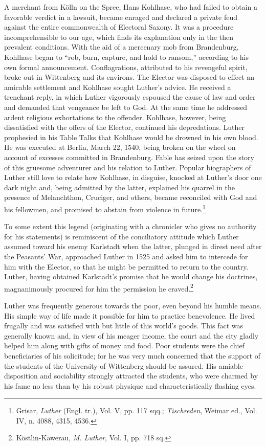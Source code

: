 A merchant from Kölln on the Spree, Hans Kohlhase, who had
failed to obtain a favorable verdict in a lawsuit, became enraged and
declared a private feud against the entire commonwealth of Electoral
Saxony. It was a procedure incomprehensible to our age, which finds
its explanation only in the then prevalent conditions. With the aid
of a mercenary mob from Brandenburg, Kohlhase began to “rob,
burn, capture, and hold to ransom,” according to his own formal
announcement. Conflagrations, attributed to his revengeful spirit,
broke out in Wittenberg and its environs. The Elector was disposed
to effect an amicable settlement and Kohlhase sought Luther’s advice.
He received a trenchant reply, in which Luther vigorously espoused
the cause of law and order and demanded that vengeance be left to
God. At the same time he addressed ardent religious exhortations to
the offender. Kohlhase, however, being dissatisfied with the offers of
the Elector, continued his depredations. Luther prophesied in his Table
Talks that Kohlhase would be drowned in his own blood. He was
executed at Berlin, March 22, 1540, being broken on the wheel on
account of excesses committed in Brandenburg. Fable has seized upon
the story of this gruesome adventurer and his relation to Luther.
Popular biographers of Luther still love to relate how Kohlhase, in
disguise, knocked at Luther’s door one dark night and, being admitted
by the latter, explained his quarrel in the presence of Melanchthon, Cruciger,
and others, became reconciled with God and his fellowmen, and promised
to abstain from violence in future.\footnote
{Grisar, \textit{Luther} (Engl. tr.), Vol. V, pp. 117 sqq.; \textit{Tischreden}, Weimar ed., Vol. IV,
n. 4088, 4315, 4536.}

To some extent this legend (originating with a chronicler who
gives no authority for his statements) is reminiscent of the conciliatory
attitude which Luther assumed toward his enemy Karlstadt when the latter,
plunged in direst need after the Peasants’ War,
approached Luther in 1525 and asked him to intercede for him with
the Elector, so that he might be permitted to return to the country.
Luther, having obtained Karlstadt’s promise that he would change
his doctrines, magnanimously procured for him the permission he
craved.\footnote{Köstlin-Kawerau, \textit{M. Luther}, Vol. I, pp. 718 sq.}


Luther was frequently generous towards the poor, even beyond
his humble means. His simple way of life made it possible for him to
practice benevolence. He lived frugally and was satisfied with but
little of this world’s goods. This fact was generally known and, in
view of his meager income, the court and the city gladly helped him
along with gifts of money and food. Poor students were the chief
beneficiaries of his solicitude; for he was very much concerned that
the support of the students of the University of Wittenberg should
be assured. His amiable disposition and sociability strongly attracted
the students, who were charmed by his fame no less than by his robust
physique and characteristically flashing eyes.

